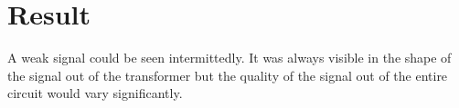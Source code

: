 \section{Result}
% 

A weak signal could be seen intermittedly. It was always visible in the shape of the signal out of the transformer but the quality of the 
signal out of the entire circuit would vary significantly.
